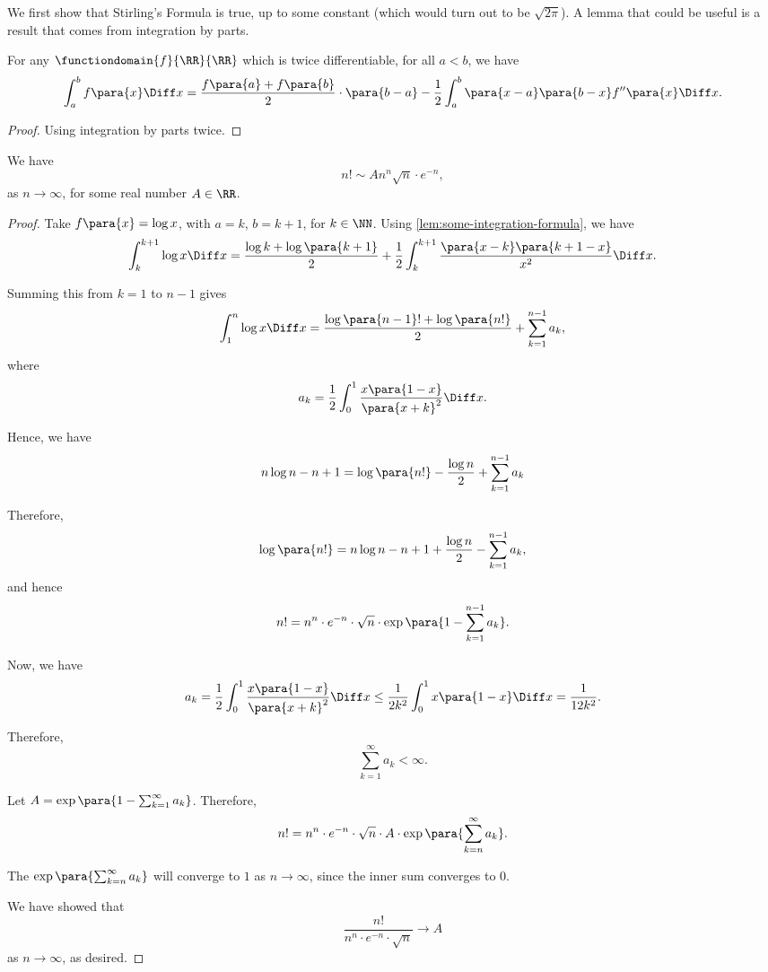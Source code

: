 We first show that Stirling's Formula is true, up to some constant (which would turn out to be \(\sqrt{2\pi}\)). A lemma that could be useful is a result that comes from integration by parts.

\begin{lemma}
    \label{lem:some-integration-formula}%
    For any \(\functiondomain{f}{\RR}{\RR}\) which is twice differentiable, for all \(a < b\), we have
    \[
        \int_a^b f\para{x} \Diff x = \frac{f\para{a} + f\para{b}}{2} \cdot \para{b - a} - \frac{1}{2} \int_a^b \para{x - a} \para{b - x} f''\para{x} \Diff x.
    \]
\end{lemma}

\begin{proof}
    Using integration by parts twice.
\end{proof}


\begin{lemma}
    \label{lem:stirling-formula-constant}%
    We have
    \[
        n! \sim A n^n \sqrt{n} \cdot e^{-n},
    \]
    as \(n \to \infty\), for some real number \(A \in \RR\).
\end{lemma}

\begin{proof}
    Take \(f\para{x} = \log x\), with \(a = k\), \(b = k + 1\), for \(k \in \NN\). Using \autoref{lem:some-integration-formula}, we have
    \[
        \int_{k}^{k + 1} \log x \Diff x = \frac{\log k + \log\para{k + 1}}{2} + \frac{1}{2} \int_{k}^{k + 1} \frac{\para{x - k} \para{k + 1 - x}}{x^2} \Diff x.
    \]

    Summing this from \(k = 1\) to \(n - 1\) gives
    \[
        \int_{1}^{n} \log x \Diff x = \frac{\log \para{n - 1}! + \log \para{n!}}{2} + \sum_{k = 1}^{n - 1} a_k,
    \]
    where
    \[
        a_k = \frac{1}{2} \int_{0}^{1} \frac{x \para{1 - x}}{\para{x + k}^2} \Diff x.
    \]

    Hence, we have
    \[
        n \log n - n + 1 = \log\para{n!} - \frac{\log n}{2} + \sum_{k = 1}^{n - 1} a_k
    \]

    Therefore,
    \[
        \log \para{n!} = n \log n - n + 1 + \frac{\log n}{2} - \sum_{k = 1}^{n - 1} a_k,
    \]
    and hence
    \[
        n! = n^n \cdot e^{-n} \cdot \sqrt{n} \cdot \exp\para{1 - \sum_{k = 1}^{n - 1} a_k}.
    \]

    Now, we have
    \[
        a_k = \frac{1}{2} \int_{0}^{1} \frac{x \para{1 - x}}{\para{x + k}^2} \Diff x \leq \frac{1}{2k^2} \int_{0}^{1} x\para{1 - x} \Diff x = \frac{1}{12k^2}.
    \]

    Therefore,
    \[
        \sum_{k = 1}^{\infty} a_k < \infty.
    \]

    Let \(A = \exp\para{1 - \sum_{k = 1}^{\infty} a_k}\). Therefore,
    \[
        n! = n^n \cdot e^{-n} \cdot \sqrt{n} \cdot A \cdot \exp\para{\sum_{k = n}^{\infty} a_k}.
    \]

    The \(\exp\para{\sum_{k = n}^{\infty} a_k}\) will converge to \(1\) as \(n \to \infty\), since the inner sum converges to \(0\).

    We have showed that
    \[
        \frac{n!}{n^n \cdot e^{-n} \cdot \sqrt{n}} \to A
    \]
    as \(n \to \infty\), as desired.
\end{proof}

